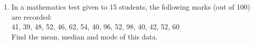 \renewcommand{\theequation}{\theenumi}
\begin{enumerate}[label=\thesection.\arabic*.,ref=\thesection.\theenumi]
\item In a mathematics test given to 15 students, the
following marks (out of 100) are recorded:\\
41, 39, 48, 52, 46, 62, 54, 40, 96, 52, 98, 40,
42, 52, 60\\
Find the mean, median and mode of this data.
\end{enumerate}